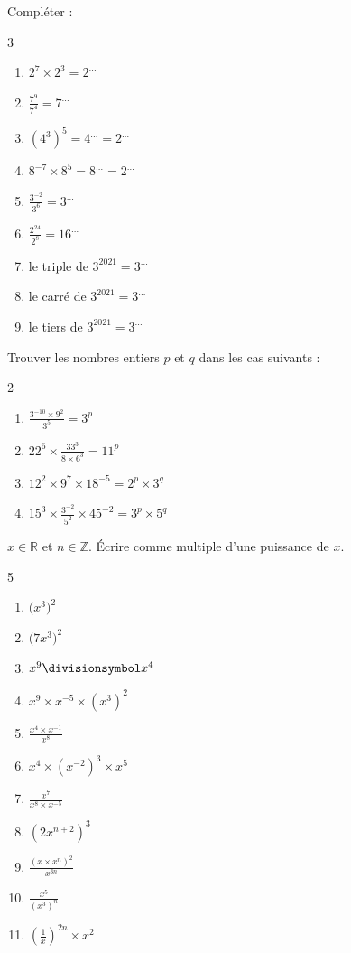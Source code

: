 \begin{exercise} Compléter :
	\begin{multicols}{3} 
		\begin{enumerate}[label={\alph*)\rule{0pt}{1.8em}},leftmargin=*] 
			\item $2^7\times 2^3=2^{\ldots}$
			\item $\tfrac{7^9}{7^4}=7^{\ldots}$
			\item $(4^3)^5=4^{\ldots}=2^{\ldots}$
			\item $8^{-7}\times 8^5=8^{\ldots}=2^{\ldots}$
			\item $\tfrac{3^{-2}}{3^6}=3^{\ldots}$
			\item $\tfrac{2^{24}}{2^8}=16^{\ldots}$
			\item le triple de $3^{2021}=3^{\ldots}$
			\item le carré de $3^{2021}=3^{\ldots}$
			\item le tiers de $3^{2021}=3^{\ldots}$ 
		\end{enumerate}
	\end{multicols} 
\end{exercise}
\begin{exercise} Trouver les nombres entiers $p$ et $q$ dans les cas suivants :
	\begin{multicols}{2} 
		\begin{enumerate}[label={\alph*)\rule{0pt}{1.6em}},leftmargin=*]
			\item $\frac{3^{-10}\times 9^2}{3^5}=3^{p}$ 
			\item $22^6\times \frac{33^3}{8\times 6^3}=11^{p}$ 
			\item $12^2\times 9^7\times 18^{-5}=2^{p}\times 3^{q}$
			\item $15^3\times \frac{3^{-2}}{5^2}\times 45^{-2}=3^{p}\times 5^{q}$
		\end{enumerate}
	\end{multicols} 
\end{exercise} 
\begin{exercise}$x\in \mathbb{R}$ et $n\in\mathbb{Z}$. Écrire comme multiple d'une puissance de $x$.
	\begin{multicols}{5} 
		\begin{enumerate}[label={\alph*)\rule{0pt}{1.8em}},leftmargin=*]
			\item $\big(x^3\big)^2$
			\item $\big(7x^3\big)^2$
			\item $x^9\divisionsymbol x^4$
			\item $x^9 \times x^{-5} \times (x^3)^2$ 
			\item $\frac{x^4 \times x^{-1}}{x^8}$ 
			\item $x^4\times (x^{-2})^3 \times x^5$     
			\item $\frac{x^7}{x^8\times x^{-5}}$  
			\item $	\left(2x^{n+2}\right)^3$
			\item $\frac{\left(x \times x^n\right)^{2}}{x^{3n}}$ 
			\item $	\frac{x^5}{\left(x^3\right)^n} $ 
			\item $\left(\frac{1}{x}\right)^{2n}\times x^2 $ 
		\end{enumerate}
	\end{multicols}  
\end{exercise} 
%	 
